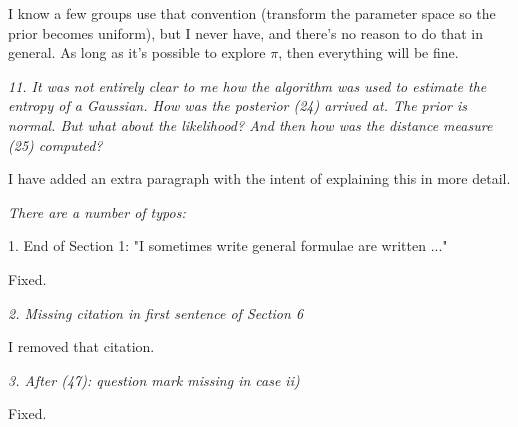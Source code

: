 \documentclass[a4paper, 12pt]{article}
\renewcommand{\quote}{\em \color{orange}}
\begin{document}
I know a few groups use that convention (transform the parameter space so
the prior becomes uniform), but I never have, and there's no reason to do
that in general. As long as it's possible to explore $\pi$, then everything
will be fine.

{\quote
11.  It was not entirely clear to me how the algorithm was used to estimate the entropy of a Gaussian.  How was the posterior (24) arrived at.  The prior is normal.  But what about the likelihood?  And then how was the distance measure (25) computed?}

I have added an extra paragraph with the intent of explaining this in more
detail.


{\quote
There are a number of typos:

1. End of Section 1: "I sometimes write general formulae are written ..."}

Fixed.

{\quote
2. Missing citation in first sentence of Section 6}

I removed that citation.

{\quote
3. After (47): question mark missing in case ii)}

Fixed.





\end{document}
